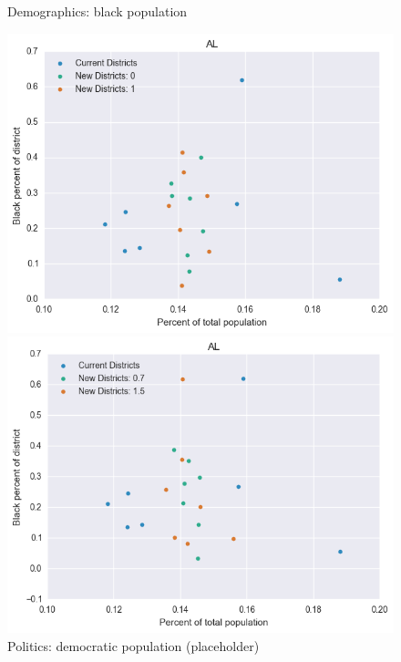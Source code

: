 \begin{figure}[htb!] \centering
\caption{ Demographics: black population }
\includegraphics[width=4.5in]{../analysis/AL/analysis_scatter.png}
\caption{ Politics: democratic population (placeholder)}
\includegraphics[width=4.5in]{../analysis/AL/analysis_scatter2.png}
\end{figure}

\clearpage
\newpage


